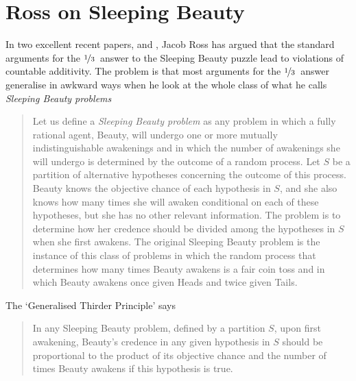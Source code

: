 \newcommand{\half}{$\nicefrac{1}{2}$}
\newcommand{\third}{$\nicefrac{1}{3}$}
\newcommand{\quarter}{$\nicefrac{1}{4}$}
\renewcommand{\C}[1]{\textit{Cr}$_#1$}
\newcommand{\TC}[1]{\text{\textit{Cr}}_#1}

\chapter[Ross on Sleeping Beauty]{Ross on Sleeping Beauty}


In two excellent recent papers, \citep{Ross2010} and \citep{Ross2012}, Jacob Ross has argued that the standard arguments for the \third\ answer to the Sleeping Beauty puzzle lead to violations of countable additivity. The problem is that most arguments for the \third\ answer generalise in awkward ways when he look at the whole class of what he calls \textit{Sleeping Beauty problems}

\begin{quote}
Let us define a \textit{Sleeping Beauty problem} as any problem in which a fully rational agent, Beauty, will undergo one or more mutually indistinguishable awakenings and in which the number of awakenings she will undergo is determined by the outcome of a random process. Let $S$ be a partition of alternative hypotheses concerning the outcome of this process. Beauty knows the objective chance of each hypothesis in $S$, and she also knows how many times she will awaken conditional on each of these hypotheses, but she has no other relevant information. The problem is to determine how her credence should be divided among the hypotheses in $S$ when she first awakens. The original Sleeping Beauty problem is the instance of this class of problems in which the random process that determines how many times Beauty awakens is a fair coin toss and in which Beauty awakens once given Heads and twice given Tails. \citep[413-4]{Ross2010}
\end{quote}

\noindent The `Generalised Thirder Principle' says 

\begin{quote}
In any Sleeping Beauty problem, defined by a partition $S$, upon first awakening, Beauty's credence in any given hypothesis in $S$ should be proportional to the product of its objective chance and the number of times Beauty awakens if this hypothesis is true. \citep[414]{Ross2010}
\end{quote} 


